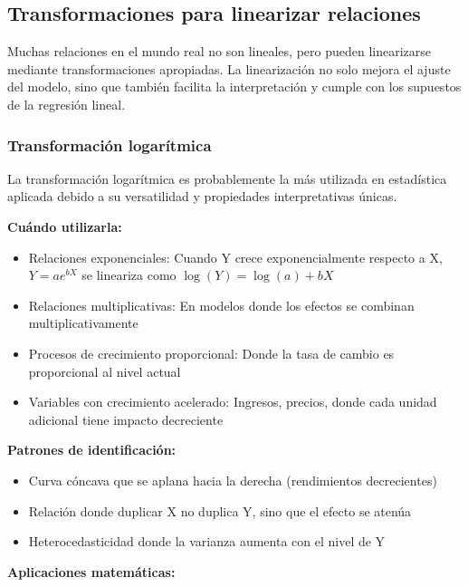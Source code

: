 \documentclass[
  letterpaper,
  DIV=11,
  numbers=noendperiod]{scrreprt}
\providecommand{\tightlist}{%
  \setlength{\itemsep}{0pt}\setlength{\parskip}{0pt}}
\begin{document}
\subsection{Transformaciones para linearizar
relaciones}\label{transformaciones-para-linearizar-relaciones}

Muchas relaciones en el mundo real no son lineales, pero pueden
linearizarse mediante transformaciones apropiadas. La linearización no
solo mejora el ajuste del modelo, sino que también facilita la
interpretación y cumple con los supuestos de la regresión lineal.

\subsubsection{Transformación
logarítmica}\label{transformaciuxf3n-logaruxedtmica}

La transformación logarítmica es probablemente la más utilizada en
estadística aplicada debido a su versatilidad y propiedades
interpretativas únicas.

\textbf{Cuándo utilizarla:}

\begin{itemize}
\tightlist
\item
  Relaciones exponenciales: Cuando Y crece exponencialmente respecto a
  X, \(Y = ae^{bX}\) se lineariza como \(\log(Y) = \log(a) + bX\)
\item
  Relaciones multiplicativas: En modelos donde los efectos se combinan
  multiplicativamente
\item
  Procesos de crecimiento proporcional: Donde la tasa de cambio es
  proporcional al nivel actual
\item
  Variables con crecimiento acelerado: Ingresos, precios, donde cada
  unidad adicional tiene impacto decreciente
\end{itemize}

\textbf{Patrones de identificación:}

\begin{itemize}
\tightlist
\item
  Curva cóncava que se aplana hacia la derecha (rendimientos
  decrecientes)
\item
  Relación donde duplicar X no duplica Y, sino que el efecto se atenúa
\item
  Heterocedasticidad donde la varianza aumenta con el nivel de Y
\end{itemize}

\textbf{Aplicaciones matemáticas:}
\end{document}
